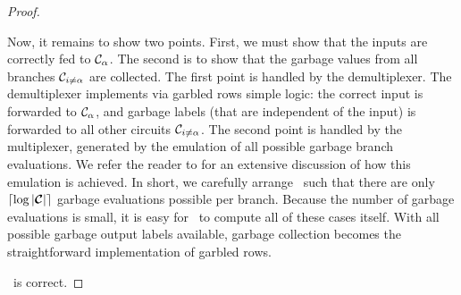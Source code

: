 \begin{proof}
\begin{itemize}
      Now, it remains to show two points.
      First, we must show that the inputs are correctly fed to
      $\mathcal C_{\alpha}$. The second is to show that the garbage values from all
      branches $\mathcal C_{i \neq \alpha}$ are collected.
      The first point is handled by the demultiplexer.
      The demultiplexer implements via garbled rows simple logic: the
      correct input is forwarded to $\mathcal C_{\alpha}$, and garbage labels (that
      are independent of the input) is forwarded to all other circuits
      $\mathcal C_{i \neq \alpha}$.
      The second point is handled by the multiplexer, generated by the
      emulation of all possible garbage branch evaluations.
      We refer the reader to  for an extensive
      discussion of how this emulation is achieved.
      In short, we carefully arrange \gadget\ such that there are
      only $\lceil \log |\vec \cir| \rceil$ garbage evaluations
      possible per branch.
      Because the number of garbage evaluations is small, it is easy
      for \gGb\ to compute all of these cases itself.
      With all possible garbage output labels available, garbage
      collection becomes the straightforward implementation of garbled
      rows.
  \end{itemize}
  \ourschemelong\ is correct.
\end{proof}

